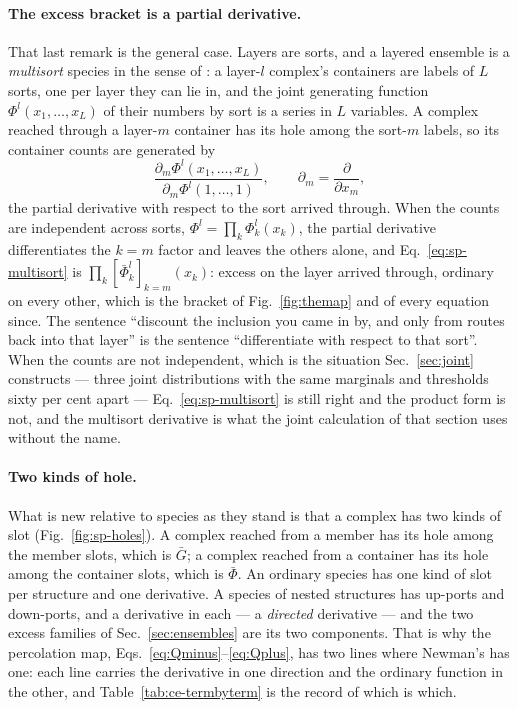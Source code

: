\paragraph{The excess bracket is a partial derivative.} That last remark is
the general case. Layers are sorts, and a layered ensemble is a
\emph{multisort} species in the sense of \citet{bergeron1998}: a
layer-$l$ complex's containers are labels of $L$ sorts, one per layer they
can lie in, and the joint generating function $\Phi^{l}(x_{1},\dots,x_{L})$
of their numbers by sort is a series in $L$ variables. A complex reached
through a layer-$m$ container has its hole among the sort-$m$ labels, so its
container counts are generated by
\begin{equation}
  \frac{\partial_{m}\Phi^{l}(x_{1},\dots,x_{L})}
       {\partial_{m}\Phi^{l}(1,\dots,1)},
  \qquad \partial_{m}=\frac{\partial}{\partial x_{m}},
  \label{eq:sp-multisort}
\end{equation}
the partial derivative with respect to the sort arrived through. When the
counts are independent across sorts, $\Phi^{l}=\prod_{k}\Phi^{l}_{k}(x_{k})$,
the partial derivative differentiates the $k=m$ factor and leaves the others
alone, and Eq.~\eqref{eq:sp-multisort} is
$\prod_{k}[\bar\Phi^{l}_{k}]_{k=m}(x_{k})$: excess on the layer arrived
through, ordinary on every other, which is the bracket of
Fig.~\ref{fig:themap} and of every equation since. The sentence ``discount
the inclusion you came in by, and only from routes back into that layer'' is
the sentence ``differentiate with respect to that sort''. When the counts
are not independent, which is the situation Sec.~\ref{sec:joint} constructs
--- three joint distributions with the same marginals and thresholds sixty
per cent apart --- Eq.~\eqref{eq:sp-multisort} is still right and the product
form is not, and the multisort derivative is what the joint calculation of
that section uses without the name.

\paragraph{Two kinds of hole.} What is new relative to species as they stand
is that a complex has two kinds of slot (Fig.~\ref{fig:sp-holes}). A
complex reached from a member has its hole among the member slots, which is
$\bar G$; a complex reached from a container has its hole among the
container slots, which is $\bar\Phi$. An ordinary species has one kind of
slot per structure and one derivative. A species of nested structures has
up-ports and down-ports, and a derivative in each --- a \emph{directed}
derivative --- and the two excess families of Sec.~\ref{sec:ensembles} are
its two components. That is why the percolation map,
Eqs.~\eqref{eq:Qminus}--\eqref{eq:Qplus}, has two lines where Newman's has
one: each line carries the derivative in one direction and the ordinary
function in the other, and Table~\ref{tab:ce-termbyterm} is the record of
which is which.

